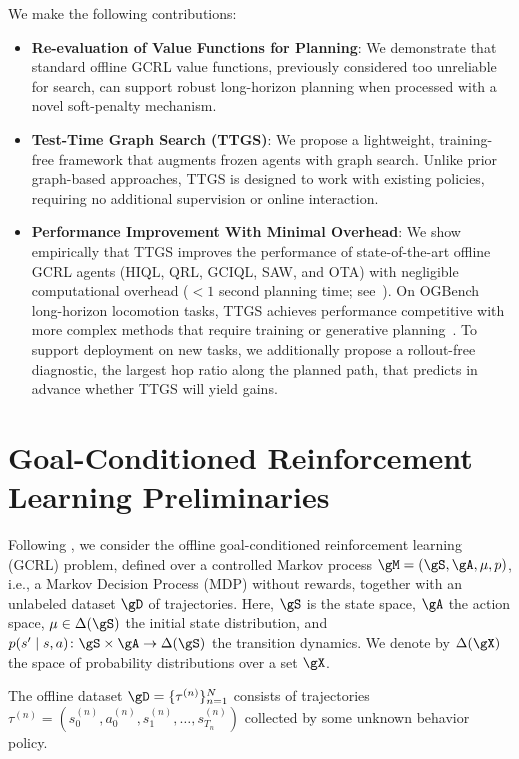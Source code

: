 \documentclass{article} %
\begin{document}
We make the following contributions:
\begin{itemize}[leftmargin=*]
\item \textbf{Re-evaluation of Value Functions for Planning}: We demonstrate that standard offline GCRL value functions, previously considered too unreliable for search, can support robust long-horizon planning when processed with a novel soft-penalty mechanism.
\item \textbf{Test-Time Graph Search (TTGS)}: We propose a lightweight, training-free framework that augments frozen agents with graph search. Unlike prior graph-based approaches, TTGS is designed to work with existing policies, requiring no additional supervision or online interaction.
\item \textbf{Performance Improvement With Minimal Overhead}: We show empirically that TTGS improves the performance of state-of-the-art offline GCRL agents (HIQL, QRL, GCIQL, SAW, and OTA) with negligible computational overhead ($<1$ second planning time; see~). On OGBench long-horizon locomotion tasks, TTGS achieves performance competitive with more complex methods that require training or generative planning~\citep{ogbench_park2025, Luo2025CompDiffuser, gas_baek2025}. To support deployment on new tasks, we additionally propose a rollout-free diagnostic, the largest hop ratio along the planned path, that predicts in advance whether TTGS will yield gains.
\end{itemize}

\section{Goal-Conditioned Reinforcement Learning Preliminaries}
Following \citet{ogbench_park2025}, we consider the offline goal-conditioned reinforcement learning (GCRL) problem, defined over a controlled Markov process
$\gM = (\gS, \gA, \mu, p)$, i.e., a Markov Decision Process (MDP) without rewards, together with an unlabeled dataset $\gD$ of trajectories.
Here, $\gS$ is the state space, $\gA$ the action space, $\mu \in \Delta(\gS)$ the initial state distribution, and
$p(s' \mid s, a)\colon \gS \times \gA \to \Delta(\gS)$ the transition dynamics. We denote by $\Delta(\gX)$ the space of probability distributions over a set $\gX$.

The offline dataset $\gD = \{\tau^{(n)}\}_{n=1}^N$ consists of trajectories $\tau^{(n)} = (s_0^{(n)}, a_0^{(n)}, s_1^{(n)}, \dots, s_{T_n}^{(n)})$ collected by some unknown behavior policy.
\end{document}
